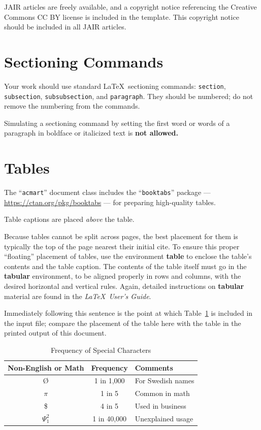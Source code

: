 \documentclass[manuscript, screen, review]{jair}
\begin{document}
JAIR articles are freely available, and a copyright notice referencing the Creative Commons CC BY license is included in the template. This copyright notice should be included in all JAIR articles.

\section{Sectioning Commands}

Your work should use standard \LaTeX\ sectioning commands:
\verb|section|, \verb|subsection|, \verb|subsubsection|, and
\verb|paragraph|. They should be numbered; do not remove the numbering
from the commands.

Simulating a sectioning command by setting the first word or words of
a paragraph in boldface or italicized text is {\bfseries not allowed.}

\section{Tables}

The ``\verb|acmart|'' document class includes the ``\verb|booktabs|''
package --- \url{https://ctan.org/pkg/booktabs} --- for preparing
high-quality tables.

Table captions are placed {\itshape above} the table.

Because tables cannot be split across pages, the best placement for
them is typically the top of the page nearest their initial cite.  To
ensure this proper ``floating'' placement of tables, use the
environment \textbf{table} to enclose the table's contents and the
table caption.  The contents of the table itself must go in the
\textbf{tabular} environment, to be aligned properly in rows and
columns, with the desired horizontal and vertical rules.  Again,
detailed instructions on \textbf{tabular} material are found in the
\textit{\LaTeX\ User's Guide}.

Immediately following this sentence is the point at which
Table~\ref{tab:freq} is included in the input file; compare the
placement of the table here with the table in the printed output of
this document.

\begin{table}
  \caption{Frequency of Special Characters}
  \label{tab:freq}
  \begin{tabular}{@{}ccl@{}}
    \toprule
    Non-English or Math&Frequency&Comments\\
    \midrule
    \O & 1 in 1,000& For Swedish names\\
    $\pi$ & 1 in 5& Common in math\\
    \$ & 4 in 5 & Used in business\\
    $\Psi^2_1$ & 1 in 40,000& Unexplained usage\\
  \bottomrule
\end{tabular}
\end{table}
\end{document}
